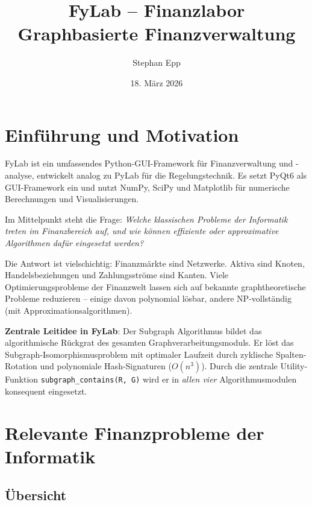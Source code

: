 \documentclass[a4paper,12pt]{article}
\title{\textbf{FyLab -- Finanzlabor}\\
\large Graphbasierte Finanzverwaltung}
\author{Stephan Epp}
\date{18. März 2026}
\begin{document}
\maketitle
\tableofcontents
\newpage

\section{Einführung und Motivation}
\label{sec:intro}

FyLab ist ein umfassendes Python-GUI-Framework für Finanzverwaltung und
-analyse, entwickelt analog zu PyLab für die Regelungstechnik. Es setzt
PyQt6 als GUI-Framework ein und nutzt NumPy, SciPy und Matplotlib
für numerische Berechnungen und Visualisierungen.

Im Mittelpunkt steht die Frage: \emph{Welche klassischen Probleme der
Informatik treten im Finanzbereich auf, und wie können effiziente oder
approximative Algorithmen dafür eingesetzt werden?}

Die Antwort ist vielschichtig: Finanzmärkte sind Netzwerke. Aktiva sind
Knoten, Handelsbeziehungen und Zahlungsströme sind Kanten. Viele
Optimierungsprobleme der Finanzwelt lassen sich auf bekannte
graphtheoretische Probleme reduzieren -- einige davon polynomial lösbar,
andere NP-vollständig (mit Approximationsalgorithmen).

\textbf{Zentrale Leitidee in FyLab}: Der Subgraph Algorithmus
bildet das algorithmische Rückgrat des gesamten Graphverarbeitungsmoduls.
Er löst das Subgraph-Isomorphismus\-problem mit optimaler Laufzeit durch
zyklische Spalten-Rotation und polynomiale Hash-Signaturen ($O(n^3)$).
Durch die zentrale Utility-Funktion \texttt{subgraph\_contains(R, G)} wird
er in \emph{allen vier} Algorithmusmodulen konsequent eingesetzt.

\section{Relevante Finanzprobleme der Informatik}
\label{sec:probleme}

\subsection{Übersicht}
\end{document}
